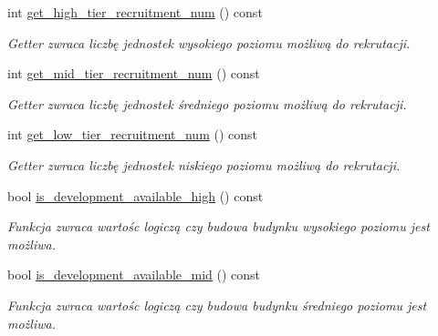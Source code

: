 \begin{DoxyCompactItemize}
\mbox{\label{classmodel_1_1Castle_abc66c3c106ba785d61a8c18c747105fb}} 
int \hyperlink{classmodel_1_1Castle_abc66c3c106ba785d61a8c18c747105fb}{get\+\_\+high\+\_\+tier\+\_\+recruitment\+\_\+num} () const
\begin{DoxyCompactList}\small\item\em Getter zwraca liczbę jednostek wysokiego poziomu możliwą do rekrutacji. \end{DoxyCompactList}\item 
\mbox{\label{classmodel_1_1Castle_a8d51d7365175bf1969f66115f22f5f6c}} 
int \hyperlink{classmodel_1_1Castle_a8d51d7365175bf1969f66115f22f5f6c}{get\+\_\+mid\+\_\+tier\+\_\+recruitment\+\_\+num} () const
\begin{DoxyCompactList}\small\item\em Getter zwraca liczbę jednostek średniego poziomu możliwą do rekrutacji. \end{DoxyCompactList}\item 
\mbox{\label{classmodel_1_1Castle_aeeb01c7a4afe8ebfd383120fe9788fce}} 
int \hyperlink{classmodel_1_1Castle_aeeb01c7a4afe8ebfd383120fe9788fce}{get\+\_\+low\+\_\+tier\+\_\+recruitment\+\_\+num} () const
\begin{DoxyCompactList}\small\item\em Getter zwraca liczbę jednostek niskiego poziomu możliwą do rekrutacji. \end{DoxyCompactList}\item 
\mbox{\label{classmodel_1_1Castle_afa5847ea8e097aaa3bfeb4f040514225}} 
bool \hyperlink{classmodel_1_1Castle_afa5847ea8e097aaa3bfeb4f040514225}{is\+\_\+development\+\_\+available\+\_\+high} () const
\begin{DoxyCompactList}\small\item\em Funkcja zwraca wartośc logiczą czy budowa budynku wysokiego poziomu jest możliwa. \end{DoxyCompactList}\item 
\mbox{\label{classmodel_1_1Castle_a125b8044d0a31b72941d14bad9a279ea}} 
bool \hyperlink{classmodel_1_1Castle_a125b8044d0a31b72941d14bad9a279ea}{is\+\_\+development\+\_\+available\+\_\+mid} () const
\begin{DoxyCompactList}\small\item\em Funkcja zwraca wartośc logiczą czy budowa budynku średniego poziomu jest możliwa. \end{DoxyCompactList}\item 

\end{DoxyCompactItemize}
